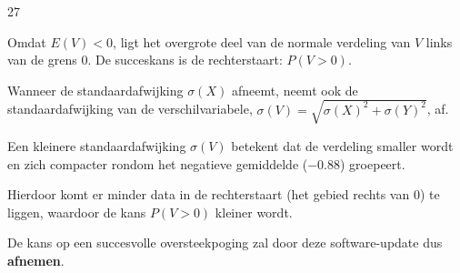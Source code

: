 \begin{question}{27}
{        Omdat $E(V) < 0$, ligt het overgrote deel van de normale verdeling van $V$ links van de grens $0$. 
        De succeskans is de rechterstaart: $P(V > 0)$. 
        
        Wanneer de standaardafwijking $\sigma(X)$ afneemt, neemt ook de standaardafwijking van de verschilvariabele, $\sigma(V) = \sqrt{\sigma(X)^2 + \sigma(Y)^2}$, af.
        
        Een kleinere standaardafwijking $\sigma(V)$ betekent dat de verdeling smaller wordt en zich compacter rondom het negatieve gemiddelde ($-0.88$) groepeert.
        
        Hierdoor komt er minder data in de rechterstaart (het gebied rechts van $0$) te liggen, waardoor de kans $P(V > 0)$ kleiner wordt.
        
        De kans op een succesvolle oversteekpoging zal door deze software-update dus \textbf{afnemen}.
    }
    
\end{question}
